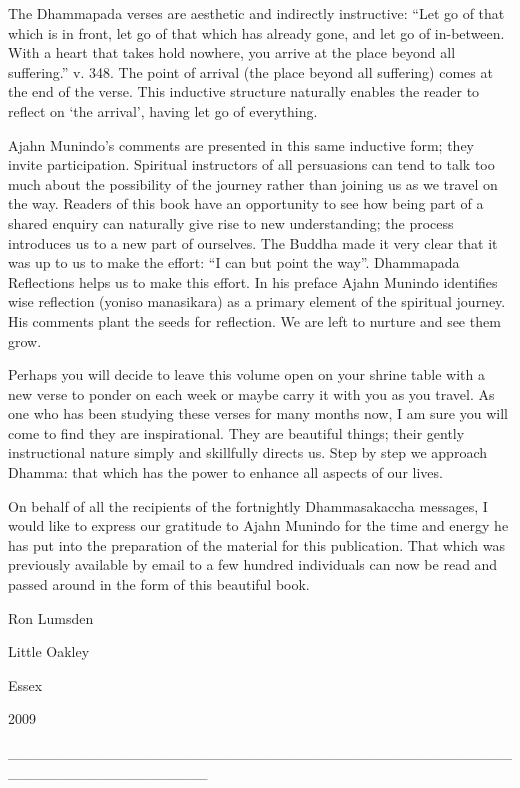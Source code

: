 \documentclass[a4paper,portrait,12pt]{article}
\begin{document}
	The Dhammapada verses are aesthetic and indirectly instructive: ``Let go of that which is in front, let go of that which has already gone, and let go of in-between. With a heart that takes hold nowhere, you arrive at the place beyond all suffering.'' v. 348. The point of arrival (the place beyond all suffering) comes at the end of the verse. This inductive structure naturally enables the reader to reflect on `the arrival', having let go of everything.


	Ajahn Munindo's comments are presented in this same inductive form; they invite participation. Spiritual instructors of all persuasions can tend to talk too much about the possibility of the journey rather than joining us as we travel on the way. Readers of this book have an opportunity to see how being part of a shared enquiry can naturally give rise to new understanding; the process introduces us to a new part of ourselves. The Buddha made it very clear that it was up to us to make the effort: ``I can but point the way''. Dhammapada Reflections helps us to make this effort. In his preface Ajahn Munindo identifies wise reflection (yoniso manasikara) as a primary element of the spiritual journey. His comments plant the seeds for reflection. We are left to nurture and see them grow. 


	Perhaps you will decide to leave this volume open on your shrine table with a new verse to ponder on each week or maybe carry it with you as you travel. As one who has been studying these verses for many months now, I am sure you will come to find they are inspirational. They are beautiful things; their gently instructional nature simply and skillfully directs us. Step by step we approach Dhamma: that which has the power to enhance all aspects of our lives. 


On behalf of all the recipients of the fortnightly Dhammasakaccha messages, I would like to express our gratitude to Ajahn Munindo for the time and energy he has put into the preparation of the material for this publication. That which was previously available by email to a few hundred individuals can now be read and passed around in the form of this beautiful book.





Ron Lumsden


Little Oakley


Essex 


2009


\_\_\_\_\_\_\_\_\_\_\_\_\_\_\_\_\_\_\_\_\_\_\_\_\_\_\_\_\_\_\_\_\_\_\_\_\_\_\_\_\_\_\_\_\_\_\_\_\_\_\_\_\_\_\_\_\_\_\_\_\_\_\_\_\_\_\_
\end{document}
